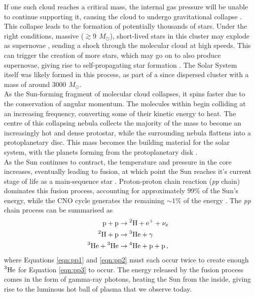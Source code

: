 \documentclass[11pt,a4paper,onecolumn]{report}
\newcommand*\chem[1]{\ensuremath{\mathrm{#1}}}
\begin{document}
If one such cloud reaches a critical mass, the internal gas pressure will be
unable to continue supporting it, causing the cloud to undergo gravitational
collapse \citep{jeans_stability_1902}. This collapse leads to the formation of
potentially thousands of stars. Under the right conditions, massive (\(\gtrsim
\SI{9}{\,M_\odot} \)), short-lived stars in this cluster may explode as
supernovae \citep{heger_how_2003}, sending a shock through the molecular cloud
at high speeds. This can trigger the creation of more stars, which may go on to
also produce supernovae, giving rise to self-propagating star formation
\citep{mueller_propagating_1976}. The Solar System itself was likely formed in
this process, as part of a since dispersed cluster with a mass of around
\(\SI{3000}{\,M_\odot} \)\citep{williams_astrophysical_2010,zwart_lost_2009}. \\

As the Sun-forming fragment of molecular cloud collapses, it spins faster due to
the conservation of angular momentum. The molecules within begin colliding at an
increasing frequency, converting some of their kinetic energy to heat. The
centre of this collapsing nebula collects the majority of the mass to become an
increasingly hot and dense protostar, while the surrounding nebula flattens into
a protoplanetary disc. This mass becomes the building material for the solar
system, with the planets forming from the protoplanetary disk
\citep{greaves_disks_2005}. \\

As the Sun continues to contract, the temperature and pressure in the core
increases, eventually leading to fusion, at which point the Sun reaches it's
current stage of life as a main-sequence star \citep{woolfson_origin_2000}.
Proton-proton chain reaction (\textit{pp} chain) dominates this fusion process,
accounting for approximately $99\%$ of the Sun's energy, while the CNO cycle
generates the remaining \(\sim 1\%\) of the energy \citep{adelberger_solar_2011}.
The \textit{pp} chain process can be summarised as
\begin{align}
  \chem{p} + \chem{p} &\rightarrow \chem{\prescript{2}{}H} + \chem{e^+} +
  \nu_e \label{eqn:pp1}\\
  \chem{\prescript{2}{}H} + \chem{p} &\rightarrow \chem{\prescript{3}{}He}
  + \gamma \label{eqn:pp2}\\
  \chem{\prescript{3}{}He} + \chem{\prescript{3}{}He} & \rightarrow
  \chem{\prescript{4}{}He} + \chem{p} + \chem{p}\,, \label{eqn:pp3}
\end{align}
where Equations \ref{eqn:pp1} and \ref{eqn:pp2} must each occur twice to create
enough $\chem{\prescript{3}{}He}$ for Equation \ref{eqn:pp3} to occur. The
energy released by the fusion process comes in the form of gamma-ray photons,
heating the Sun from the inside, giving rise to the luminous hot ball of plasma
that we observe today. \\
\end{document}
